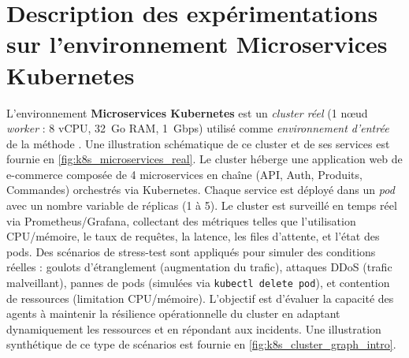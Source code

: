 \section{Description des expérimentations sur l'environnement Microservices Kubernetes}


L'environnement \textbf{Microservices Kubernetes} est un \emph{cluster réel} (1 nœud \textit{worker} : 8 vCPU, 32~Go RAM, 1~Gbps) utilisé comme \emph{environnement d'entrée} de la méthode . Une illustration schématique de ce cluster et de ses services est fournie en \autoref{fig:k8s_microservices_real}. Le cluster héberge une application web de e-commerce composée de 4 microservices en chaîne (API, Auth, Produits, Commandes) orchestrés via Kubernetes. Chaque service est déployé dans un \emph{pod} avec un nombre variable de réplicas (1 à 5). Le cluster est surveillé en temps réel via Prometheus/Grafana, collectant des métriques telles que l'utilisation CPU/mémoire, le taux de requêtes, la latence, les files d'attente, et l'état des pods. Des scénarios de stress-test sont appliqués pour simuler des conditions réelles : goulots d'étranglement (augmentation du trafic), attaques DDoS (trafic malveillant), pannes de pods (simulées via \texttt{kubectl delete pod}), et contention de ressources (limitation CPU/mémoire). L'objectif est d'évaluer la capacité des agents à maintenir la résilience opérationnelle du cluster en adaptant dynamiquement les ressources et en répondant aux incidents. Une illustration synthétique de ce type de scénarios est fournie en \autoref{fig:k8s_cluster_graph_intro}.

